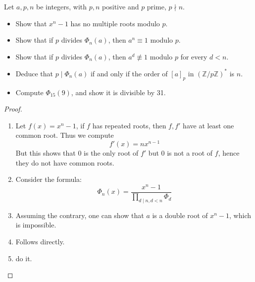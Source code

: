 \documentclass[openany]{book}
\begin{document}
\begin{prob}
Let $a, p, n$ be integers, with $p, n$ positive and $p$ prime, $p \nmid n$.
\begin{itemize}
\item Show that $x^n - 1$ has no multiple roots modulo $p$.
\item Show that if $p$ divides $\Phi_n(a)$, then $a^n \equiv 1$ modulo $p$.
\item Show that if $p$ divides $\Phi_n(a)$, then $a^d \not\equiv 1$ modulo $p$ for every $d < n$.
\item Deduce that $p \mid \Phi_n(a)$ if and only if the order of $[a]_p$ in $(\mathbb{Z}/p\mathbb{Z})^*$ is $n$.
\item Compute $\Phi_{15}(9)$, and show it is divisible by 31.
\end{itemize}
\end{prob}
\begin{proof}
    \begin{enumerate}
        \item Let $f(x)=x^n-1$, if $f$ has repeated roots, then $f,f'$ have at least one common root. Thus we compute 
        \begin{equation*}
            f'(x)=nx^{n-1}
        \end{equation*}
        But this shows that $0$ is the only root of $f'$ but $0$ is not a root of $f$, hence they do not have common roots.
        \item Consider the formula:
        \begin{equation*}
            \Phi_n(x)=\frac{x^n-1}{\prod_{d\mid n, d<n}\Phi_d}
        \end{equation*}
        \item Assuming the contrary, one can show that $a$ is a double root of $x^n-1$, which is impossible.
        \item Follows directly.
        \item do it.
    \end{enumerate}
\end{proof}



\end{document}
